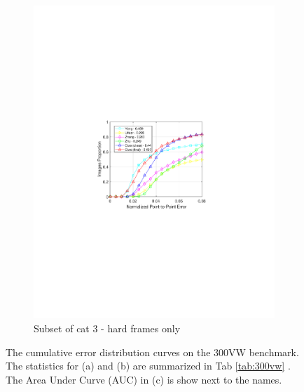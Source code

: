 \documentclass[letterpaper]{article} %
\begin{document}
\begin{figure}[t]
\begin{subfigure}[b]{0.3\textwidth}
            \includegraphics[width=\textwidth]{fig/HardCurve.pdf}
            \caption{{\small Subset of cat 3 - hard frames only}}    
            \label{fig:test6}
        \end{subfigure}
    \caption{\small The cumulative error distribution curves on the 300VW benchmark. The statistics for (a) and (b) are summarized in Tab \ref{tab:300vw} . The Area Under Curve (AUC) in (c) is show next to the names.}
    \label{fig:curves}
\end{figure}

%
\end{document}
